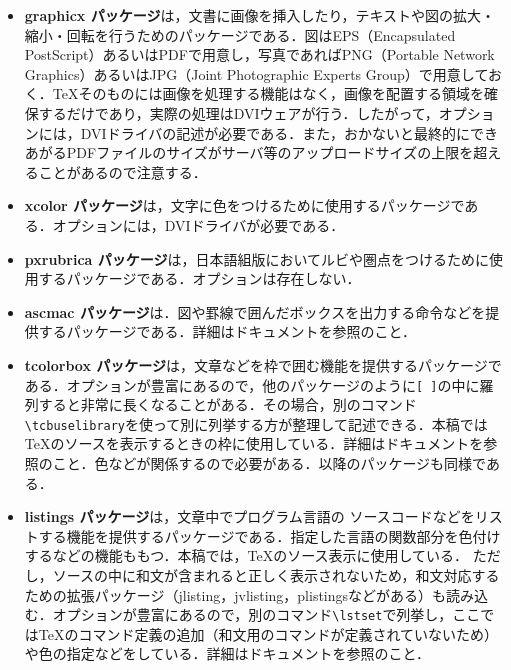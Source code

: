 \begin{itemize}
\item{\sffamily\bfseries graphicx パッケージ}は，文書に画像を挿入したり，テキストや図の拡大・縮小・回転を行うためのパッケージである\cite{graphicx}．図はEPS（Encapsulated PostScript）あるいはPDFで用意し，写真であればPNG（Portable Network Graphics）あるいはJPG（Joint Photographic Experts Group）で用意しておく．{\TeX}そのものには画像を処理する機能はなく，画像を配置する領域を確保するだけであり，実際の処理はDVIウェアが行う．したがって，オプションには，DVIドライバの記述が必要である．また，おかないと最終的にできあがるPDFファイルのサイズがサーバ等のアップロードサイズの上限を超えることがあるので注意する．

\item{\sffamily\bfseries xcolor パッケージ}は，文字に色をつけるために使用するパッケージである\cite{xcolor}．オプションには，DVIドライバが必要である．

\item{\sffamily\bfseries pxrubrica パッケージ}は，日本語組版においてルビや圏点をつけるために使用するパッケージである\cite{pxrubrica}．オプションは存在しない．

\item{\sffamily\bfseries ascmac パッケージ}は．図や罫線で囲んだボックスを出力する命令などを提供するパッケージである\cite{ascmac}．詳細はドキュメントを参照のこと．

\item{\sffamily\bfseries tcolorbox パッケージ}は，文章などを枠で囲む機能を提供するパッケージである\cite{tcolorbox}．オプションが豊富にあるので，他のパッケージのように\verb|[ ]|の中に羅列すると非常に長くなることがある．その場合，別のコマンド\verb|\tcbuselibrary|を使って別に列挙する方が整理して記述できる．本稿では{\TeX}のソースを表示するときの枠に使用している．詳細はドキュメントを参照のこと．色などが関係するので必要がある．以降のパッケージも同様である．

\item{\sffamily\bfseries listings パッケージ}は，文章中でプログラム言語の
ソースコードなどをリストする機能を提供するパッケージである\cite{listings}．指定した言語の関数部分を色付けするなどの機能ももつ．本稿では，{\TeX}のソース表示に使用している．
ただし，ソースの中に和文が含まれると正しく表示されないため，和文対応するための拡張パッケージ（jlisting，jvlisting，plistingsなどがある）も読み込む．オプションが豊富にあるので，別のコマンド\verb|\lstset|で列挙し，ここでは{\TeX}のコマンド定義の追加（和文用のコマンドが定義されていないため）や色の指定などをしている．詳細はドキュメントを参照のこと．


\end{itemize}
